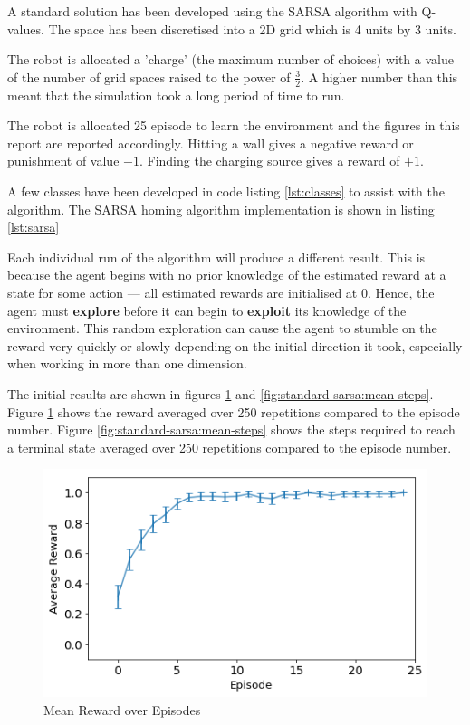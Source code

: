 \documentclass[11pt,journal,transmag,final]{IEEEtran}
\begin{document}
    A standard solution has been developed using the SARSA algorithm with Q-values. The space has been discretised into a 2D grid which is 4 units by 3 units.

    The robot is allocated a 'charge' (the maximum number of choices) with a value of the number of grid spaces raised to the power of $\frac{3}{2}$. A higher number than this meant that the simulation took a long period of time to run.

    The robot is allocated 25 episode to learn the environment and the figures in this report are reported accordingly. Hitting a wall gives a negative reward or punishment of value $-1$. Finding the charging source gives a reward of $+1$.

    A few classes have been developed in code listing \ref{lst:classes} to assist with the algorithm. The SARSA homing algorithm implementation is shown in listing \ref{lst:sarsa}

    Each individual run of the algorithm will produce a different result. This is because the agent begins with no prior knowledge of the estimated reward at a state for some action --- all estimated rewards are initialised at 0. Hence, the agent must \textbf{explore} before it can begin to \textbf{exploit} its knowledge of the environment. This random exploration can cause the agent to stumble on the reward very quickly or slowly depending on the initial direction it took, especially when working in more than one dimension.

    The initial results are shown in figures \ref{fig:standard-sarsa:mean-reward} and \ref{fig:standard-sarsa:mean-steps}. Figure \ref{fig:standard-sarsa:mean-reward} shows the reward averaged over 250 repetitions compared to the episode number. Figure \ref{fig:standard-sarsa:mean-steps} shows the steps required to reach a terminal state averaged over 250 repetitions compared to the episode number.

    \begin{figure}
        \begin{center}
            \includegraphics[width=\linewidth,keepaspectratio]{figures/ss-mean-reward.png}
            \caption{Mean Reward over Episodes}
            \label{fig:standard-sarsa:mean-reward}
        \end{center}
    \end{figure}
\end{document}
